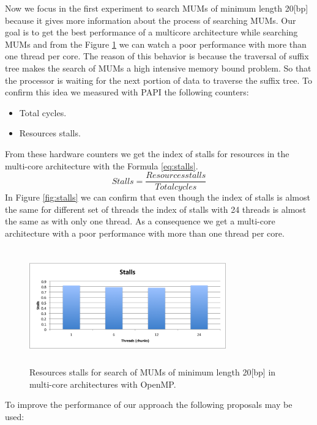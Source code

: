 \documentclass[3p,times]{elsarticle}
\begin{document}
 Now we focus in the first experiment to search MUMs of minimum length 20[bp] because it gives more information about the process of searching MUMs. Our goal is to get the best performance of a multicore architecture while searching MUMs and from the Figure \ref{fig:speedup} we can watch a poor performance with more than one thread per core. The reason of this behavior is because the traversal of suffix tree makes the search of MUMs a high intensive memory bound problem. So that the processor is waiting for the next portion of data to traverse the suffix tree. To confirm this idea we measured with PAPI the following counters:
 \begin{itemize}
   \item Total cycles.
   \item Resources stalls.
 \end{itemize}
 From these hardware counters we get the index of stalls for resources in the multi-core architecture with the Formula \ref{eq:stalls}.
 \begin{equation}
   Stalls=\frac{Resources stalls}{Total cycles}
   \label{eq:stalls}
 \end{equation}
 In Figure \ref{fig:stalls} we can confirm that even though the index of stalls is almost the same for different set of threads the index of stalls with 24 threads is almost the same as with only one thread. As a consequence we get a multi-core architecture with a poor performance with more than one thread per core.
 \begin{figure}[htb]
  \centering
  \includegraphics[width=8.5cm,height=5cm]{stalls.png}
  \caption{Resources stalls for search of MUMs of minimum length 20[bp] in multi-core architectures with OpenMP.}
  \label{fig:speedup}
 \end{figure}  
 To improve the performance of our approach the following proposals may be used:
\end{document}
